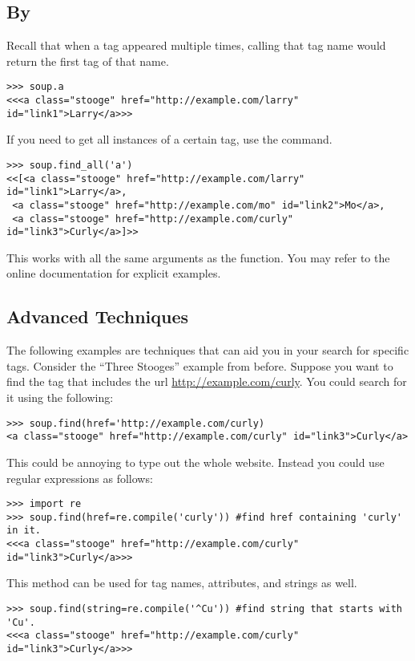\subsection*{By }

Recall that when a tag appeared multiple times, calling that tag name would return the first tag of that name.
\begin{lstlisting}
>>> soup.a
<<<a class="stooge" href="http://example.com/larry" id="link1">Larry</a>>>
\end{lstlisting}

If you need to get all instances of a certain tag, use the  command.
\begin{lstlisting}
>>> soup.find_all('a')
<<[<a class="stooge" href="http://example.com/larry" id="link1">Larry</a>,
 <a class="stooge" href="http://example.com/mo" id="link2">Mo</a>,
 <a class="stooge" href="http://example.com/curly" id="link3">Curly</a>]>>
\end{lstlisting}

This works with all the same arguments as the  function.
You may refer to the online documentation for explicit examples.

\subsection*{Advanced Techniques}
The following examples are techniques that can aid you in your search for specific tags.
Consider the ``Three Stooges'' example from before.
Suppose you want to find the tag that includes the url \url{http://example.com/curly}.
You could search for it using the following:
\begin{lstlisting}
>>> soup.find(href='http://example.com/curly)
<a class="stooge" href="http://example.com/curly" id="link3">Curly</a>
\end{lstlisting}
This could be annoying to type out the whole website.
Instead you could use regular expressions as follows:
\begin{lstlisting}
>>> import re
>>> soup.find(href=re.compile('curly')) #find href containing 'curly' in it.
<<<a class="stooge" href="http://example.com/curly" id="link3">Curly</a>>>
\end{lstlisting}
This method can be used for tag names, attributes, and strings as well.
\begin{lstlisting}
>>> soup.find(string=re.compile('^Cu')) #find string that starts with 'Cu'.
<<<a class="stooge" href="http://example.com/curly" id="link3">Curly</a>>>
\end{lstlisting}


